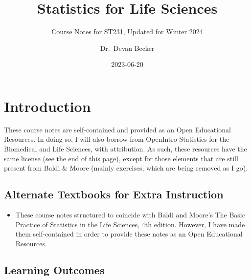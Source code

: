 \documentclass[
  letterpaper,
  DIV=11,
  numbers=noendperiod,
  oneside]{scrreprt}
\title{Statistics for Life Sciences}
\subtitle{Course Notes for ST231, Updated for Winter 2024}
\author{Dr.~Devan Becker}
\date{2023-06-20}
\providecommand{\tightlist}{%
  \setlength{\itemsep}{0pt}\setlength{\parskip}{0pt}}\usepackage{longtable,booktabs,array}
\renewcommand*\contentsname{Table of contents}
\newcommand\contentsname{Table of contents}
\begin{document}
\maketitle
\ifdefined\Shaded\renewenvironment{Shaded}{\begin{tcolorbox}[frame hidden, interior hidden, sharp corners, breakable, enhanced, borderline west={3pt}{0pt}{shadecolor}, boxrule=0pt]}{\end{tcolorbox}}\fi

\renewcommand*\contentsname{Table of contents}
{
\hypersetup{linkcolor=}
\setcounter{tocdepth}{2}
\tableofcontents
}

\hypertarget{introduction}{%
\chapter*{Introduction}\label{introduction}}


These course notes are self-contained and provided as an Open
Educational Resources. In doing so, I will also borrow from OpenIntro
Statistics for the Biomedical and Life Sciences, with attribution. As
such, these resources have the same license (see the end of this page),
except for those elements that are still present from Baldi \& Moore
(mainly exercises, which are being removed as I go).

\hypertarget{alternate-textbooks-for-extra-instruction}{%
\section*{Alternate Textbooks for Extra
Instruction}\label{alternate-textbooks-for-extra-instruction}}


\begin{itemize}
\tightlist
\item
  These course notes structured to coincide with Baldi and Moore's The
  Basic Practice of Statistics in the Life Sciences, 4th edition.
  However, I have made them self-contained in order to provide these
  notes as an Open Educational Resources.
\end{itemize}

\hypertarget{learning-outcomes}{%
\section*{Learning Outcomes}\label{learning-outcomes}}
\end{document}
